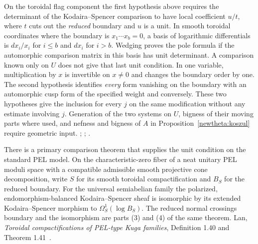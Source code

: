 On the toroidal flag component the first hypothesis above requires
the determinant of the Kodaira--Spencer comparison to have local
coefficient \(u/t\), where \(t\) cuts out the \emph{reduced}
boundary and \(u\) is a unit. In smooth toroidal coordinates where
the boundary is \(x_1\cdots x_b=0\), a basis of logarithmic
differentials is \(dx_i/x_i\) for \(i\le b\) and \(dx_i\) for
\(i>b\). Wedging proves the pole formula if the automorphic
comparison matrix in this basis has unit determinant. A comparison
known only on \(U\) does not give that last unit condition. In one
variable, multiplication by \(x\) is invertible on \(x\ne0\) and
changes the boundary order by one. The second hypothesis identifies
\emph{every} form vanishing on the boundary with an automorphic cusp
form of the specified weight and conversely. These two hypotheses
give the inclusion for every \(j\) on the same modification without
any estimate involving \(j\). Generation of the two systems on \(U\),
bigness of their moving parts where used, and nefness and bigness of
\(A\) in Proposition~\ref{newtheta:koszul} require geometric input.
;
;
.

There is a primary comparison theorem that supplies the unit condition
on the standard PEL model. On the characteristic-zero fiber of a
neat unitary PEL moduli space with a compatible admissible smooth
projective cone decomposition, write \(S\) for its smooth toroidal
compactification and \(B_S\) for the reduced boundary. For the
universal semiabelian family the polarized, endomorphism-balanced
Kodaira--Spencer sheaf is isomorphic by its extended Kodaira--Spencer
morphism to \(\Omega^1_S(\log B_S)\). The reduced normal crossings
boundary and the isomorphism are parts (3) and (4) of the same
theorem. Lan,
\emph{Toroidal compactifications of PEL-type Kuga families},
Definition 1.40 and Theorem 1.41~\cite{lanToroidal}.

